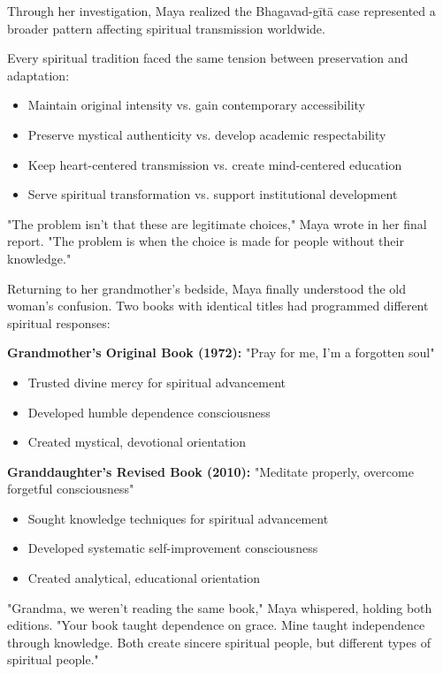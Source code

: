 \documentclass[12pt,twoside]{book}
\begin{document}
Through her investigation, Maya realized the Bhagavad-gītā case represented a broader pattern affecting spiritual transmission worldwide.

Every spiritual tradition faced the same tension between preservation and adaptation:
\begin{itemize}
\item Maintain original intensity vs. gain contemporary accessibility
\item Preserve mystical authenticity vs. develop academic respectability
\item Keep heart-centered transmission vs. create mind-centered education
\item Serve spiritual transformation vs. support institutional development
\end{itemize}

"The problem isn't that these are legitimate choices," Maya wrote in her final report. "The problem is when the choice is made for people without their knowledge."

Returning to her grandmother's bedside, Maya finally understood the old woman's confusion. Two books with identical titles had programmed different spiritual responses:

\textbf{\textbf{Grandmother's Original Book (1972):}}
"Pray for me, I'm a forgotten soul"
\begin{itemize}
\item Trusted divine mercy for spiritual advancement
\item Developed humble dependence consciousness
\item Created mystical, devotional orientation
\end{itemize}

\textbf{\textbf{Granddaughter's Revised Book (2010):}}
"Meditate properly, overcome forgetful consciousness"  
\begin{itemize}
\item Sought knowledge techniques for spiritual advancement
\item Developed systematic self-improvement consciousness
\item Created analytical, educational orientation
\end{itemize}

"Grandma, we weren't reading the same book," Maya whispered, holding both editions. "Your book taught dependence on grace. Mine taught independence through knowledge. Both create sincere spiritual people, but different types of spiritual people."
\end{document}
